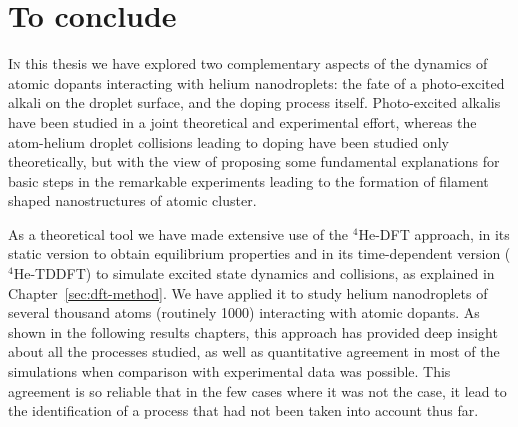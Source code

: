 \newcommand{\nhcomm}[1]{\textit{\textcolor{blue}{(#1)}$_{N}$}}
\newcommand{\nhrepl}[2]{{\footnotesize[#1]}$_{N}$\textbf{#2 ---}}
\newcommand{\nhdel}[1]{{\footnotesize[\textcolor{red}{#1}]}$_{N}$}
\newcommand{\nhadd}[1]{\textbf{\textcolor{green}{#1 ---}}}


\chapter{To conclude}

\lettrine[lines=4]{\color{activeColor}I}{n} this thesis we have explored two complementary aspects of the dynamics of atomic dopants interacting with helium nanodroplets: the fate of a photo-excited alkali on the droplet surface, and the doping process itself. Photo-excited alkalis have been studied in a joint theoretical and experimental effort, whereas the atom-helium droplet collisions leading to doping have been studied only theoretically, but with the view of proposing some fundamental explanations for basic steps in the remarkable experiments leading to the formation of filament shaped nanostructures of atomic cluster.

As a theoretical tool we have made extensive use of the $^4$He-DFT approach, in its static version to obtain equilibrium properties and in its time-dependent version ($^4$He-TDDFT) to simulate excited state dynamics and collisions, as explained in Chapter~\ref{sec:dft-method}. We have applied it to study helium nanodroplets of several thousand atoms (routinely 1000) interacting with atomic dopants. As shown in the following results chapters, this approach has provided deep insight about all the processes studied, as well as quantitative agreement in most of the simulations when comparison with experimental data was possible. This agreement is so reliable that in the few cases where it was not the case, it lead to the identification of a process that had not been taken into account thus far.

